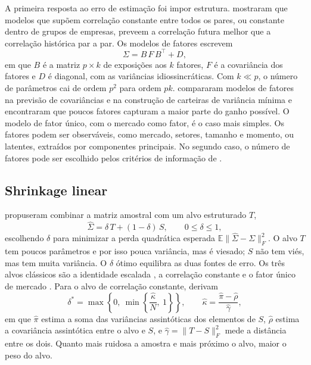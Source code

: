 A primeira resposta ao erro de estimação foi impor estrutura. \citet{elton1973} mostraram que modelos
que supõem correlação constante entre todos os pares, ou constante dentro de grupos de empresas, preveem
a correlação futura melhor que a correlação histórica par a par. Os modelos de fatores escrevem
\begin{equation}
  \Sigma = B\,F\,B^\top + D,
  \label{eq:fatores}
\end{equation}
em que $B$ é a matriz $p\times k$ de exposições aos $k$ fatores, $F$ é a covariância dos fatores e $D$
é diagonal, com as variâncias idiossincráticas. Com $k\ll p$, o número de parâmetros cai de ordem $p^2$
para ordem $pk$. \citet{chan1999} compararam modelos de fatores na previsão de covariâncias e na
construção de carteiras de variância mínima e encontraram que poucos fatores capturam a maior parte do
ganho possível. O modelo de fator único, com o mercado como fator, é o caso mais simples. Os fatores
podem ser observáveis, como mercado, setores, tamanho e momento, ou latentes, extraídos por componentes
principais. No segundo caso, o número de fatores pode ser escolhido pelos critérios de informação de
\citet{bai2002}.

\subsection{Shrinkage linear}

\citet{ledoit2003,ledoit2004honey,ledoit2004jmva} propuseram combinar a matriz amostral com um alvo
estruturado $T$,
\begin{equation}
  \hat\Sigma = \delta\,T + (1-\delta)\,S,\qquad 0\le\delta\le 1,
  \label{eq:shrinkage}
\end{equation}
escolhendo $\delta$ para minimizar a perda quadrática esperada
$\mathbb E\|\hat\Sigma-\Sigma\|_F^2$. O alvo $T$ tem poucos parâmetros e por isso pouca variância, mas
é viesado; $S$ não tem viés, mas tem muita variância. O $\delta$ ótimo equilibra as duas fontes de erro.
Os três alvos clássicos são a identidade escalada \citep{ledoit2004jmva}, a correlação constante
\citep{ledoit2004honey} e o fator único de mercado \citep{ledoit2003}. Para o alvo de correlação
constante, \citet{ledoit2004honey} derivam
\begin{equation}
  \delta^* = \max\!\left\{0,\ \min\!\left\{\frac{\hat\kappa}{N},\ 1\right\}\right\},
  \qquad \hat\kappa = \frac{\hat\pi - \hat\rho}{\hat\gamma},
  \label{eq:delta-lw}
\end{equation}
em que $\hat\pi$ estima a soma das variâncias assintóticas dos elementos de $S$, $\hat\rho$ estima a
covariância assintótica entre o alvo e $S$, e $\hat\gamma=\|T-S\|_F^2$ mede a distância entre os dois.
Quanto mais ruidosa a amostra e mais próximo o alvo, maior o peso do alvo.

